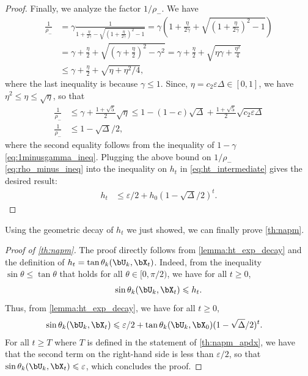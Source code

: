 \documentclass{article}
\theoremstyle{plain}
\theoremstyle{definition}
\theoremstyle{remark}
\begin{document}
\begin{proof}
  Finally, we analyze the factor $1/\rho_-$. We have
  \begin{align*}
    \frac{1}{\rho_-} & = \gamma \frac{1}{1 + \frac{\eta}{2\gamma} - \sqrt{\left(1 + \frac{\eta}{2\gamma}\right)^2 - 1}} = \gamma \left(1 + \frac{\eta}{2\gamma} + \sqrt{\left(1 + \frac{\eta}{2\gamma}\right)^2 - 1}\right) \\
    & = \gamma + \frac{\eta}{2} + \sqrt{\left( \gamma + \frac{\eta}{2}\right)^2 - \gamma ^2} = \gamma  + \frac{\eta}{2} + \sqrt{\eta \gamma + \frac{\eta^2}{4}} \\
    & \leqslant \gamma + \frac{\eta}{2} + \sqrt{\eta + \eta^2 / 4},
  \end{align*}
  where the last inequality is because $\gamma \leqslant 1$. Since, $\eta = c_2 \varepsilon \Delta \in [0,1]$, we have $\eta^2 \leqslant \eta \leqslant \sqrt{\eta}$, so that
  \begin{align}
    \frac{1}{\rho_-} & \leqslant \gamma + \frac{1 + \sqrt{5}}{2}\sqrt{\eta} \leqslant 1 - (1 - c)\sqrt{\Delta} + \frac{1 + \sqrt{5}}{2}\sqrt{c_2 \varepsilon \Delta} \nonumber\\
    \frac{1}{\rho_-} & \leqslant  1 - \sqrt{\Delta}/2 \label{eq:rho_minus_ineq},
  \end{align}
  where the second equality follows from the inequality of $1-\gamma$ \eqref{eq:1minusgamma_ineq}. Plugging the above bound on $1/\rho_-$ \eqref{eq:rho_minus_ineq} into the inequality on $h_t$ in \eqref{eq:ht_intermediate} gives the desired result:
  \begin{align*}
    h_t & \leqslant \varepsilon/2 + h_0 \left(1 - \sqrt{\Delta}/2\right)^t.
  \end{align*}
\end{proof}

Using the geometric decay of $h_t$ we just showed, we can finally prove \cref{th:napm}.

\begin{proof}[Proof of \cref{th:napm}]
  The proof directly follows from \cref{lemma:ht_exp_decay} and the definition of $h_t = \tan \theta_k(\bU_k, \bX_t)$. Indeed, from the inequality $\sin \theta \leqslant \tan \theta$ that holds for all $\theta \in [0,\pi/2)$, we have for all $t\geqslant 0$,
  \begin{align*}
    \sin \theta_k(\bU_k, \bX_t) \leqslant h_t.
  \end{align*}
  Thus, from \cref{lemma:ht_exp_decay}, we have for all $t\geqslant 0$,
  \begin{align*}
    \sin \theta_k(\bU_k, \bX_t) & \leqslant \varepsilon/2 + \tan \theta_k(\bU_k, \bX_0) (1 - \sqrt{\Delta}/2)^t.
  \end{align*}
  For all $t\geqslant T$ where $T$ is defined in the statement of \cref{th:napm_apdx}, we have that the second term on the right-hand side is less than $\varepsilon/2$,  so that $\sin \theta_k(\bU_k, \bX_t) \leqslant \varepsilon$, which concludes the proof.
  
\end{proof}
\end{document}

